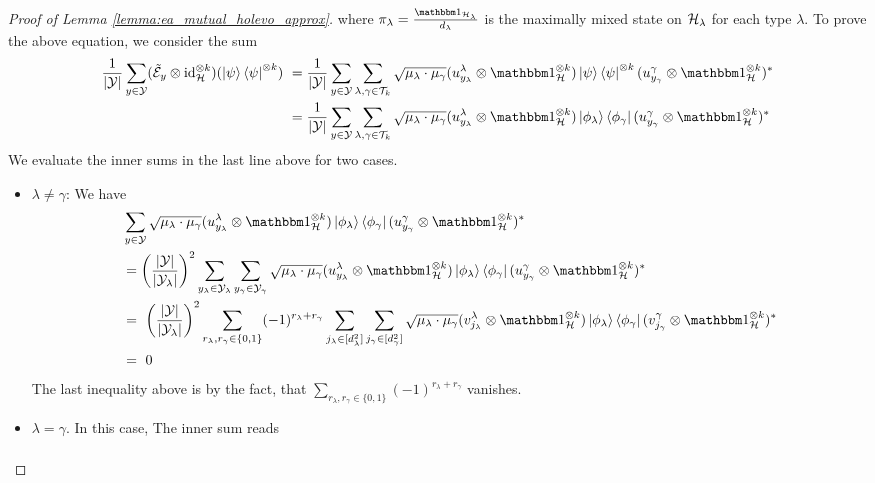 \begin{proof}[Proof of Lemma \ref{lemma:ea_mutual_holevo_approx}]
where $\pi_\lambda = \frac{\bbmeins_{\cH_\lambda}}{d_\lambda}$ is the maximally mixed state on ${\mathcal H}_\lambda$ for each type $\lambda$. To prove the above equation, we consider the sum
\begin{align*}
 \frac{1}{|\cY|}\sum_{y \in \cY} (\tilde{\cE}_y \otimes \id_{\cH}^{\otimes k})(\ket{\psi}\bra{\psi}^{\otimes k}) \
 & = \frac{1}{|\cY|}\sum_{y \in \cY}\sum_{\lambda, \gamma \in \cT_k} 
	   \sqrt{\mu_\lambda\cdot \mu_\gamma} (u_{y_\lambda}^\lambda \otimes \bbmeins_{\cH}^{\otimes k})\ket{\psi}\bra{\psi}^{\otimes k}(u_{y_\gamma}^\gamma \otimes \bbmeins_{\cH}^{\otimes k})^\ast \\
 & = \frac{1}{|\cY|}\sum_{y \in \cY}\sum_{\lambda, \gamma \in \cT_k} 
 \sqrt{\mu_\lambda\cdot \mu_\gamma} (u_{y_\lambda}^\lambda \otimes \bbmeins_{\cH}^{\otimes k})\ket{\phi_\lambda}\bra{\phi_\gamma}(u_{y_\gamma}^\gamma \otimes \bbmeins_{\cH}^{\otimes k})^\ast 
 \end{align*}
  We evaluate the inner sums in the last line above for two cases. 
  \begin{itemize}
  	\item $\lambda \neq \gamma$: We have
  	\begin{align*}
     & \sum_{y \in \cY} 
     \sqrt{\mu_\lambda\cdot \mu_\gamma} (u_{y_\lambda}^\lambda \otimes \bbmeins_{\cH}^{\otimes k})\ket{\phi_\lambda}\bra{\phi_\gamma}(u_{y_\gamma}^\gamma \otimes \bbmeins_{\cH}^{\otimes k})^\ast \\
     &= \left(\frac{|\cY|}{|\cY_\lambda|}\right)^2\sum_{y_\lambda \in \cY_\lambda}\sum_{y_\gamma \in \cY_\gamma}
     \sqrt{\mu_\lambda\cdot \mu_\gamma} (u_{y_\lambda}^\lambda \otimes \bbmeins_{\cH}^{\otimes k})\ket{\phi_\lambda}\bra{\phi_\gamma}(u_{y_\gamma}^\gamma \otimes \bbmeins_{\cH}^{\otimes k})^\ast \\
     &= \ \left(\frac{|\cY|}{|\cY_\lambda|}\right)^2 \sum_{r_\lambda, r_\gamma \in \{0,1\}} (-1)^{r_\lambda + r_\gamma} \sum_{j_\lambda \in [d_\lambda^2]} \sum_{j_\gamma \in [d_\gamma^2]}
     \sqrt{\mu_\lambda\cdot \mu_\gamma} (v_{j_\lambda}^\lambda \otimes \bbmeins_{\cH}^{\otimes k})\ket{\phi_\lambda}\bra{\phi_\gamma}(v_{j_\gamma}^\gamma \otimes \bbmeins_{\cH}^{\otimes k})^\ast \\
  	& = \ 0
  	\end{align*} 
  	The last inequality above is by the fact, that $\sum_{r_\lambda, r_\gamma \in \{0,1\}} (-1)^{r_\lambda + r_\gamma}$ vanishes.
    \item $\lambda = \gamma$. In this case, The inner sum reads
    \begin{align*} 

\end{align*}
\end{itemize}
\end{proof}
